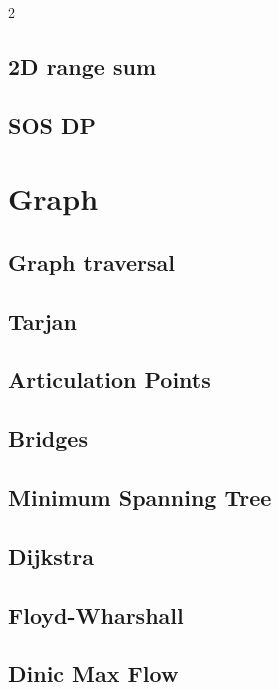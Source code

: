 \documentclass[10pt, a4paper]{article}
\begin{document}
\begin{landscape}
\begin{multicols}{2}
\subsection{2D range sum}
\raggedbottom
\subsection{SOS DP}
\raggedbottom

\section{Graph}
\subsection{Graph traversal}
\raggedbottom
\subsection{Tarjan}
\raggedbottom
\subsection{Articulation Points}
\raggedbottom
\subsection{Bridges}
\raggedbottom
\subsection{Minimum Spanning Tree}
\raggedbottom
\subsection{Dijkstra}
\raggedbottom
\subsection{Floyd-Wharshall}
\raggedbottom
\subsection{Dinic Max Flow}
\raggedbottom

\end{multicols}
\end{landscape}
\end{document}
